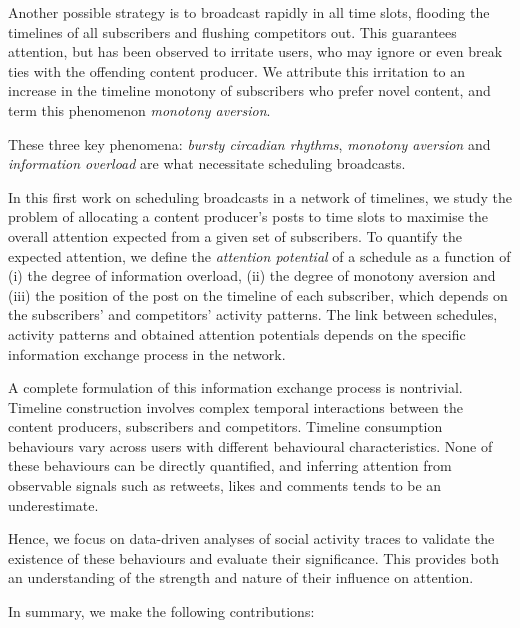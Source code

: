 \documentclass[onesided,asymmetric]{tufte-book}
\begin{document}
Another possible strategy is to broadcast rapidly in all time slots, flooding the timelines of all subscribers and flushing competitors out. This guarantees attention, but has been observed to irritate users, who may ignore\cite[-10pc]{counts2011taking}\cite[-7pc]{comarela2012understanding} or even break ties\cite[-4pc]{kwak2011fragile} with the offending content producer. We attribute this irritation to an increase in the timeline monotony of subscribers who prefer novel content, and term this phenomenon \textit{monotony aversion}.

These three key phenomena: \textit{bursty circadian rhythms}, \textit{monotony aversion} and \textit{information overload} are what necessitate scheduling broadcasts.

In this first work on scheduling broadcasts in a network of timelines, we study the problem of allocating a content producer's posts to time slots to maximise the overall attention expected from a given set of subscribers. To quantify the expected attention, we define the \textit{attention potential} of a schedule as a function of (i) the degree of information overload, (ii) the degree of monotony aversion and (iii) the position of the post on the timeline of each subscriber, which depends on the subscribers' and competitors' activity patterns. The link between schedules, activity patterns and obtained attention potentials depends on the specific information exchange process in the network.

A complete formulation of this information exchange process is nontrivial. Timeline construction involves complex temporal interactions between the content producers, subscribers and competitors. Timeline consumption behaviours vary across users with different behavioural characteristics. None of these behaviours can be directly quantified, and inferring attention from observable signals such as retweets, likes and comments tends to be an underestimate\cite{Bernstein:2013:QIA:2470654.2470658}.

Hence, we focus on data-driven analyses of social activity traces to validate the existence of these behaviours and evaluate their significance. This provides both an understanding of the strength and nature of their influence on attention.

\newpage

In summary, we make the following contributions:
\end{document}
